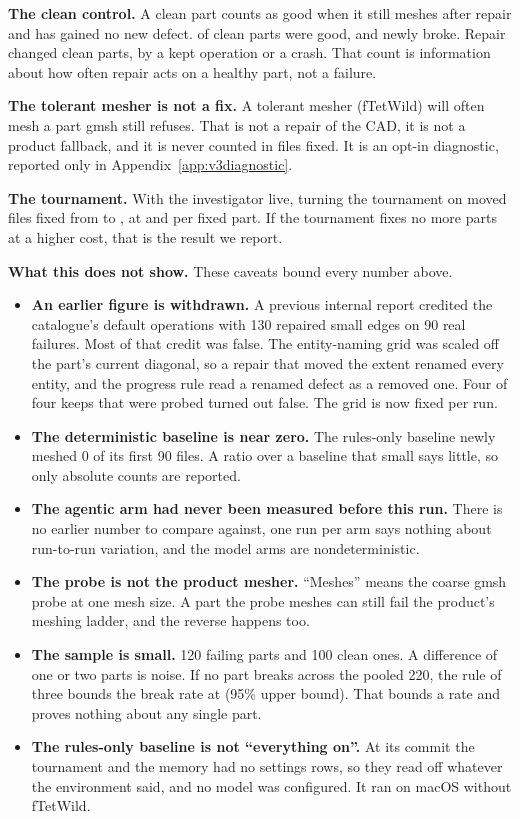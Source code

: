 \documentclass[10pt,onecolumn]{article}
\newcommand{\topic}[1]{\textbf{#1.}\hspace{0.5em}\ignorespaces}
\begin{document}
\topic{The clean control} A clean part counts as good when it still meshes after repair and has
gained no new defect. \vThreeCleanStillGood{} of \vThreeCleanNFiles{} clean parts were good, and
\vThreeCleanNewlyBroken{} newly broke. Repair changed \vThreeCleanChanged{} clean parts, by a kept
operation or a crash. That count is information about how often repair acts on a healthy part, not
a failure.

\topic{The tolerant mesher is not a fix} A tolerant mesher (fTetWild) will often mesh a part gmsh
still refuses. That is not a repair of the CAD, it is not a product fallback, and it is never
counted in files fixed. It is an opt-in diagnostic, reported only in
Appendix~\ref{app:v3diagnostic}.

\vThreeOpsTable

\topic{The tournament} With the investigator live, turning the tournament on moved files fixed from
\vThreeTourOffFilesFixed{} to \vThreeTourOnFilesFixed{}, at \vThreeTourOffCostPerFixed{} and
\vThreeTourOnCostPerFixed{} per fixed part. If the tournament fixes no more parts at a higher cost,
that is the result we report.

\topic{What this does not show} These caveats bound every number above.
\begin{itemize}
\item \textbf{An earlier figure is withdrawn.} A previous internal report credited the catalogue's
  default operations with 130 repaired small edges on 90 real failures. Most of that credit was
  false. The entity-naming grid was scaled off the part's current diagonal, so a repair that moved
  the extent renamed every entity, and the progress rule read a renamed defect as a removed one.
  Four of four keeps that were probed turned out false. The grid is now fixed per run.
\item \textbf{The deterministic baseline is near zero.} The rules-only baseline newly meshed 0 of
  its first 90 files. A ratio over a baseline that small says little, so only absolute counts are
  reported.
\item \textbf{The agentic arm had never been measured before this run.} There is no earlier number
  to compare against, one run per arm says nothing about run-to-run variation, and the model arms
  are nondeterministic.
\item \textbf{The probe is not the product mesher.} ``Meshes'' means the coarse gmsh probe at one
  mesh size. A part the probe meshes can still fail the product's meshing ladder, and the reverse
  happens too.
\item \textbf{The sample is small.} 120 failing parts and 100 clean ones. A difference of one or two
  parts is noise. If no part breaks across the pooled 220, the rule of three bounds the break rate
  at \vThreeZeroBreakBound{} (95\% upper bound). That bounds a rate and proves nothing about any
  single part.
\item \textbf{The rules-only baseline is not ``everything on''.} At its commit the tournament and the
  memory had no settings rows, so they read off whatever the environment said, and no model was
  configured. It ran on macOS without fTetWild.
\end{itemize}
\end{document}
